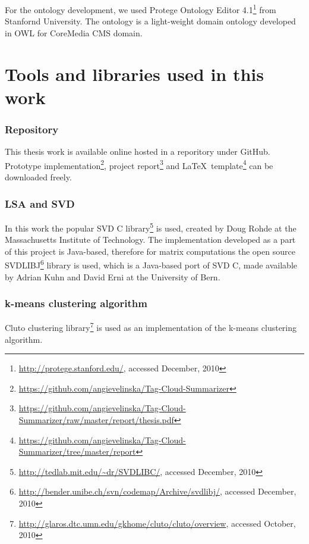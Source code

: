 For the ontology development, we used Protege Ontology Editor 4.1\footnote{\url{http://protege.stanford.edu/}, accessed December, 2010} from Stanfornd University. The ontology is a light-weight domain ontology developed in OWL for CoreMedia \gls{CMS} domain. \\


\section{Tools and libraries used in this work}
\label{sec:implementation:tools_used}

\subsubsection{Repository}
This thesis work is available online hosted in a reporitory under GitHub. Prototype implementation\footnote{\url{https://github.com/angievelinska/Tag-Cloud-Summarizer}}, project report\footnote{\url{https://github.com/angievelinska/Tag-Cloud-Summarizer/raw/master/report/thesis.pdf}} and \LaTeX~template\footnote{\url{https://github.com/angievelinska/Tag-Cloud-Summarizer/tree/master/report}} can be downloaded freely. \\

\subsubsection{LSA and SVD}
In this work the popular SVD C library\footnote{\url{http://tedlab.mit.edu/~dr/SVDLIBC/}, accessed December, 2010}  is used, created by Doug Rohde at the Massachusetts Institute of Technology. The implementation developed as a part of this project is Java-based, therefore for matrix computations the open source SVDLIBJ\footnote{\url{http://bender.unibe.ch/svn/codemap/Archive/svdlibj/}, accessed December, 2010} library is used, which is a Java-based port of SVD C, made available by Adrian Kuhn and David Erni at the University of Bern. \\

\subsubsection{k-means clustering algorithm}
Cluto clustering library\footnote{\url{http://glaros.dtc.umn.edu/gkhome/cluto/cluto/overview}, accessed October, 2010} is used as an implementation of the k-means clustering algorithm.\\

